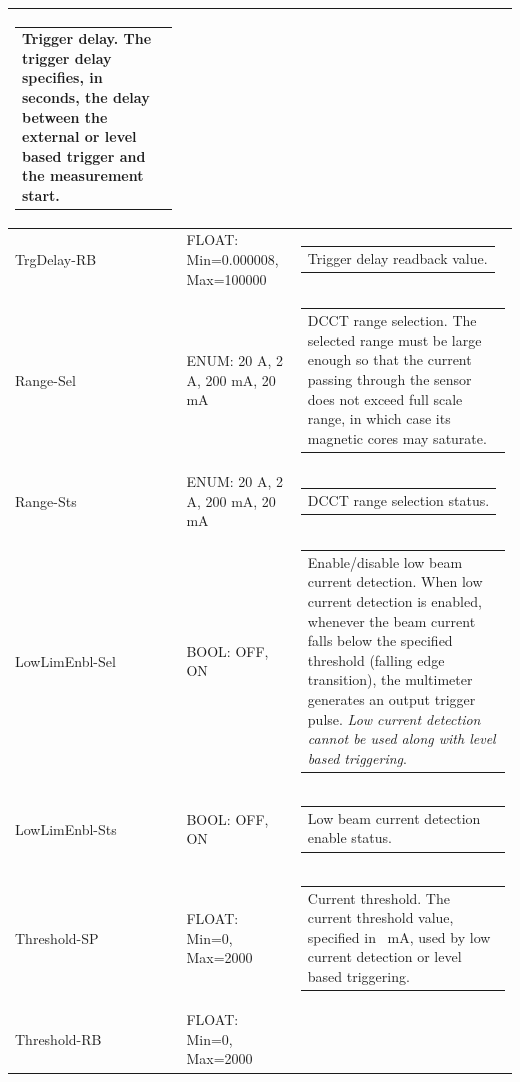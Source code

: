 \documentclass[openany]{article}
\begin{document}
\begin{longtable}{| m{3.0cm} m{4.5cm} m{7.0cm} |}
\begin{tabular}{@{}m{6cm}@{}}
	    					Trigger delay. The trigger delay specifies, in seconds, the delay between the external or level based trigger and the measurement start.
						\end{tabular} \\ \hline
		TrgDelay-RB & FLOAT: Min=0.000008, Max=100000 & \begin{tabular}{@{}m{6cm}@{}}
	    					Trigger delay readback value.
						\end{tabular} \\ \hline
		Range-Sel & ENUM: 20 A, 2 A, 200 mA, 20 mA & \begin{tabular}{@{}m{6cm}@{}}
	    					DCCT range selection. The selected range must be large enough so that the current passing through the sensor does not exceed full scale range, in which case its magnetic cores may saturate.
						\end{tabular} \\ \hline
		Range-Sts & ENUM: 20 A, 2 A, 200 mA, 20 mA & \begin{tabular}{@{}m{6cm}@{}}
	    					DCCT range selection status.
						\end{tabular} \\ \hline
		LowLimEnbl-Sel & BOOL: OFF, ON & \begin{tabular}{@{}m{6cm}@{}}
	    					Enable/disable low beam current detection. When low current detection is enabled, whenever the beam current falls below the specified threshold (falling edge transition), the multimeter generates an output trigger pulse. \emph{Low current detection cannot be used along with level based triggering}.
						\end{tabular} \\ \hline
		LowLimEnbl-Sts & BOOL: OFF, ON & \begin{tabular}{@{}m{6cm}@{}}
	    					Low beam current detection enable status.
						\end{tabular} \\ \hline
		Threshold-SP & FLOAT: Min=0, Max=2000 & \begin{tabular}{@{}m{6cm}@{}}
	    					Current threshold. The current threshold value, specified in \SI{}{\milli\ampere}, used by low current detection or level based triggering.
						\end{tabular} \\ \hline
		Threshold-RB & FLOAT: Min=0, Max=2000 & \begin{tabular}{@{}m{6cm}@{}}

\end{tabular}
\end{longtable}
\end{document}
